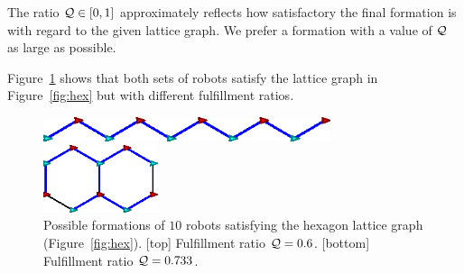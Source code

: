 The ratio $\mathcal{Q} \in [0, 1]$ approximately reflects how satisfactory the final formation is 
with regard to the given lattice graph. 
%
We prefer a formation with a value of $\mathcal{Q}$ as large as possible.

Figure~\ref{fig:hex-qual} shows that both sets of robots satisfy the lattice
graph in Figure~\ref{fig:hex} but with different fulfillment ratios.
\begin{figure}  
    \centering
    \begin{minipage}[b]{0.95\linewidth}
        \centering
        \includegraphics[width=0.75\textwidth]{figs/bad-hexagon}
        
    \end{minipage}
    \begin{minipage}[b]{0.95\linewidth}
        \centering
        \includegraphics[width=0.3\textwidth]{figs/good-hexagon}
    \end{minipage}
    \caption{Possible formations of $10$ robots satisfying the hexagon lattice graph (Figure~\ref{fig:hex}). 
    [top] Fulfillment ratio $\mathcal{Q}=0.6$. 
    [bottom] Fulfillment ratio $\mathcal{Q} = 0.733$.}
    \label{fig:hex-qual}
\end{figure}

